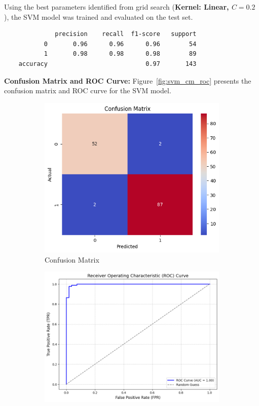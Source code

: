 \documentclass[12pt]{article}
\begin{document}
Using the best parameters identified from grid search (\textbf{Kernel: Linear, \(C=0.2\)}), the SVM model was trained and evaluated on the test set.

\begin{verbatim}
              precision    recall  f1-score   support
           0       0.96      0.96      0.96        54
           1       0.98      0.98      0.98        89
    accuracy                           0.97       143
\end{verbatim}

\textbf{Confusion Matrix and ROC Curve:} Figure~\ref{fig:svm_cm_roc} presents the confusion matrix and ROC curve for the SVM model.

\begin{figure}[H]
    \centering
    \begin{subfigure}[b]{0.4\textwidth}
        \centering
        \includegraphics[width=\textwidth]{assets/svm/svm-cm.png}
        \caption{Confusion Matrix}
        \label{fig:svm_cm}
    \end{subfigure}
    \hfill
    \begin{subfigure}[b]{0.4\textwidth}
        \centering
        \includegraphics[width=\textwidth]{assets/svm/svm-roc.png}

\end{subfigure}
\end{figure}
\end{document}
